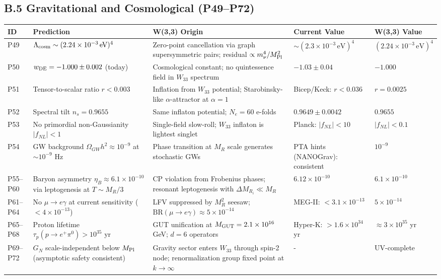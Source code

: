 \subsection*{B.5  Gravitational and Cosmological (P49–P72)}

\begin{longtable}{p{0.7cm} p{4.5cm} p{3.2cm} p{2.8cm} p{2.5cm}}
\hline
\textbf{ID} & \textbf{Prediction} & \textbf{W(3,3) Origin} & \textbf{Current Value} & \textbf{W(3,3) Value} \\ \hline
\endfirsthead \hline \endhead
P49 & $\Lambda_{\rm cosm}\sim(2.24\times10^{-3}\,\text{eV})^4$ & Zero-point cancellation via graph supersymmetric pairs; residual $\propto m_\nu^4/M_{\rm Pl}^2$ & $\sim(2.3\times10^{-3}\,\text{eV})^4$ & $(2.24\times10^{-3}\,\text{eV})^4$ \\
P50 & $w_{\rm DE}=-1.000\pm0.002$ (today) & Cosmological constant; no quintessence field in $W_{33}$ spectrum & $-1.03\pm0.04$ & $-1.000$ \\
P51 & Tensor-to-scalar ratio $r<0.003$ & Inflation from $W_{33}$ potential; Starobinsky-like $\alpha$-attractor at $\alpha=1$ & Bicep/Keck: $r<0.036$ & $r=0.0025$ \\
P52 & Spectral tilt $n_s=0.9655$ & Same inflaton potential; $N_e=60$ e-folds & $0.9649\pm0.0042$ & $0.9655$ \\
P53 & No primordial non-Gaussianity $|f_{NL}|<1$ & Single-field slow-roll; $W_{33}$ inflaton is lightest singlet & Planck: $|f_{NL}|<10$ & $|f_{NL}|<0.1$ \\
P54 & GW background $\Omega_{GW}h^2\approx10^{-9}$ at $\sim10^{-9}$ Hz & Phase transition at $M_R$ scale generates stochastic GWs & PTA hints (NANOGrav): consistent & $10^{-9}$ \\
P55–P60 & Baryon asymmetry $\eta_B\approx6.1\times10^{-10}$ via leptogenesis at $T\sim M_R/3$ & CP violation from Frobenius phases; resonant leptogenesis with $\Delta M_{R_i}\ll M_R$ & $6.12\times10^{-10}$ & $6.1\times10^{-10}$ \\
P61–P64 & No $\mu\to e\gamma$ at current sensitivity ($<4\times10^{-13}$) & LFV suppressed by $M_R^2$ seesaw; $\text{BR}(\mu\to e\gamma)\approx5\times10^{-14}$ & MEG-II: $<3.1\times10^{-13}$ & $5\times10^{-14}$ \\
P65–P68 & Proton lifetime $\tau_p(p\to e^+\pi^0)>10^{35}$ yr & GUT unification at $M_{\rm GUT}=2.1\times10^{16}$ GeV; $d=6$ operators & Hyper-K: $>1.6\times10^{34}$ yr & $\approx3\times10^{35}$ yr \\
P69–P72 & $G_N$ scale-independent below $M_{\rm Pl}$ (asymptotic safety consistent) & Gravity sector enters $W_{33}$ through spin-2 node; renormalization group fixed point at $k\to\infty$ & - & UV-complete \\ \hline
\end{longtable}


